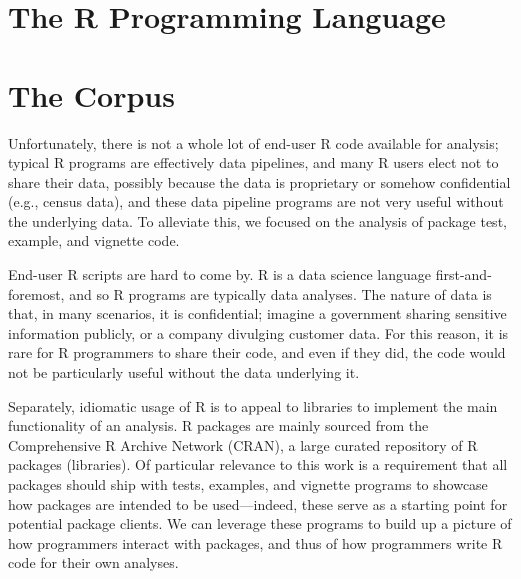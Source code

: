 \documentclass[sigplan,10pt,review,anonymous]{acmart}\settopmatter{printfolios=true,printccs=false,printacmref=false}
\begin{document}
%
%
%
%
%
%
\section{The R Programming Language}
\label{sec:rlang}


%
%
%
%
%
%
\section{The Corpus}
\label{sec:corpus}


Unfortunately, there is not a whole lot of end-user R code available for analysis; typical R programs are effectively data pipelines, and many R users elect not to share their data, possibly because the data is proprietary or somehow confidential (e.g., census data), and these data pipeline programs are not very useful without the underlying data.
To alleviate this, we focused on the analysis of package test, example, and vignette code.

End-user R scripts are hard to come by.
R is a data science language first-and-foremost, and so R programs are typically data analyses.
The nature of data is that, in many scenarios, it is confidential; imagine a government sharing sensitive information publicly, or a company divulging customer data.
For this reason, it is rare for R programmers to share their code, and even if they did, the code would not be particularly useful without the data underlying it.

Separately, idiomatic usage of R is to appeal to libraries to implement the main functionality of an analysis.
R packages are mainly sourced from the Comprehensive R Archive Network (CRAN), a large curated repository of R packages (libraries).
Of particular relevance to this work is a requirement that all packages should ship with tests, examples, and vignette programs to showcase how packages are intended to be used---indeed, these serve as a starting point for potential package clients.
We can leverage these programs to build up a picture of how programmers interact with packages, and thus of how programmers write R code for their own analyses. 
\end{document}
